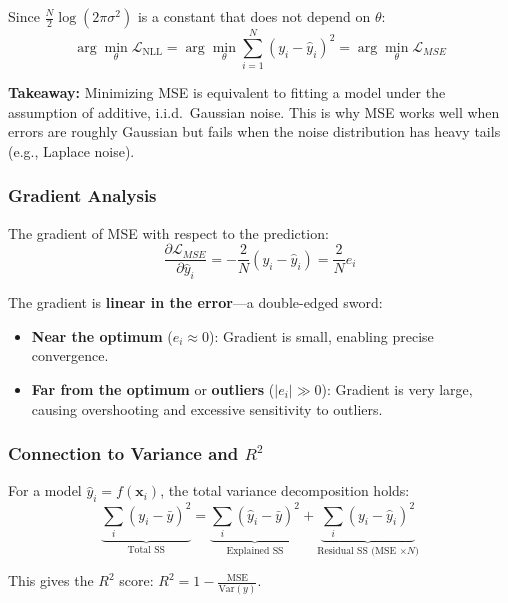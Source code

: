 Since $\frac{N}{2}\log(2\pi\sigma^2)$ is a constant that does not depend on $\theta$:
\begin{equation}
\boxed{\arg\min_\theta \mathcal{L}_{\text{NLL}} = \arg\min_\theta \sum_{i=1}^{N}(y_i - \hat{y}_i)^2 = \arg\min_\theta \mathcal{L}_{MSE}}
\end{equation}

\textbf{Takeaway:} Minimizing MSE is equivalent to fitting a model under the assumption of additive, i.i.d.\ Gaussian noise. This is why MSE works well when errors are roughly Gaussian but fails when the noise distribution has heavy tails (e.g., Laplace noise).

\subsubsection{Gradient Analysis}

The gradient of MSE with respect to the prediction:
\begin{equation}
\frac{\partial \mathcal{L}_{MSE}}{\partial \hat{y}_i} = -\frac{2}{N}(y_i - \hat{y}_i) = \frac{2}{N}e_i
\end{equation}

The gradient is \textbf{linear in the error}---a double-edged sword:
\begin{itemize}
    \item \textbf{Near the optimum} ($e_i \approx 0$): Gradient is small, enabling precise convergence.
    \item \textbf{Far from the optimum} or \textbf{outliers} ($|e_i| \gg 0$): Gradient is very large, causing overshooting and excessive sensitivity to outliers.
\end{itemize}

\subsubsection{Connection to Variance and \texorpdfstring{$R^2$}{R^2}}

For a model $\hat{y}_i = f(\mathbf{x}_i)$, the total variance decomposition holds:
\begin{equation}
\underbrace{\sum_i (y_i - \bar{y})^2}_{\text{Total SS}} = \underbrace{\sum_i (\hat{y}_i - \bar{y})^2}_{\text{Explained SS}} + \underbrace{\sum_i (y_i - \hat{y}_i)^2}_{\text{Residual SS (MSE $\times N$)}}
\end{equation}

This gives the $R^2$ score: $R^2 = 1 - \frac{\text{MSE}}{\text{Var}(y)}$.

